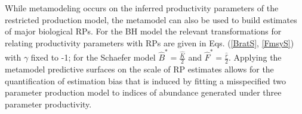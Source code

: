%
While metamodeling occurs on the inferred productivity parameters of the 
restricted production model, the metamodel can also be used to build 
estimates of major biological RPs. For the BH model the relevant 
transformations for relating productivity parameters with RPs are given in 
Eqs. (\ref{BratS}, \ref{FmsyS}) with $\gamma$ fixed to -1; for the Schaefer 
model $\hat B^*=\frac{\hat K}{2}$ and $\hat F^*=\frac{\hat r}{2}$.
%
Applying the metamodel predictive surfaces on the scale of RP estimates allows for the 
quantification of estimation bias that is induced by fitting a misspecified two parameter 
production model to indices of abundance generated under three parameter productivity.

